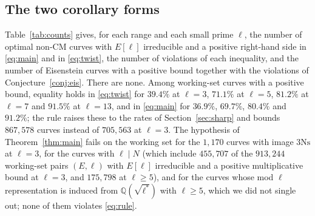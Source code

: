 \documentclass[11pt]{amsart}
\theoremstyle{definition}
\newcommand{\Q}{\mathbb{Q}}
\newcommand{\Ns}{3\mathrm{Ns}}
\begin{document}
\subsection{The two corollary forms}\label{sec:forms}
Table~\ref{tab:counts} gives, for each range and each small prime $\ell$, the number of optimal non-CM curves with $E[\ell]$ irreducible and a positive right-hand side in \eqref{eq:main} and in \eqref{eq:twist}, the number of violations of each inequality, and the number of Eisenstein curves with a positive bound together with the violations of Conjecture~\ref{conj:eis}. There are none. Among working-set curves with a positive bound, equality holds in \eqref{eq:twist} for $39.4\%$ at $\ell=3$, $71.1\%$ at $\ell=5$, $81.2\%$ at $\ell=7$ and $91.5\%$ at $\ell=13$, and in \eqref{eq:main} for $36.9\%$, $69.7\%$, $80.4\%$ and $91.2\%$; the rule raises these to the rates of Section~\ref{sec:sharp} and bounds $867{,}578$ curves instead of $705{,}563$ at $\ell=3$. The hypothesis of Theorem~\ref{thm:main} fails on the working set for the $1{,}170$ curves with image $\Ns$ at $\ell=3$, for the curves with $\ell\mid N$ (which include $455{,}707$ of the $913{,}244$ working-set pairs $(E,\ell)$ with $E[\ell]$ irreducible and a positive multiplicative bound at $\ell=3$, and $175{,}798$ at $\ell\ge5$), and for the curves whose mod $\ell$ representation is induced from $\Q(\sqrt{\ell^*})$ with $\ell\ge5$, which we did not single out; none of them violates \eqref{eq:rule}.

\begin{table}[ht]
\centering\footnotesize

\caption{Verification counts for the two corollary forms. ``\eqref{eq:main} $>0$'' is the number of curves with $E[\ell]$ irreducible, not CM, for which the right-hand side of \eqref{eq:main} is positive, and ``viol.'' the number of violations; likewise for \eqref{eq:twist}. The last column counts the Eisenstein curves with a positive bound in \eqref{eq:main} and the violations of Conjecture~\ref{conj:eis}.}\label{tab:counts}
\end{table}
\end{document}
